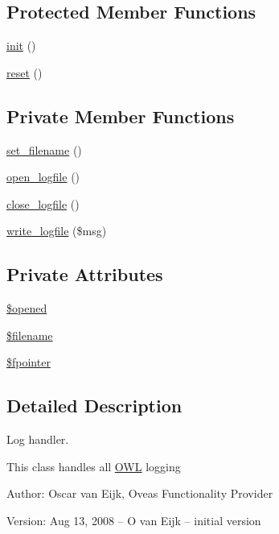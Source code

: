 \subsection*{Protected Member Functions}
\begin{CompactItemize}
\item 
\hyperlink{class__OWL_e0ef3ded56e8a6b34b6461e5a721cd3e}{init} ()
\item 
\hyperlink{class__OWL_2f2a042bcf31965194c03033df0edc9b}{reset} ()
\end{CompactItemize}
\subsection*{Private Member Functions}
\begin{CompactItemize}
\item 
\hyperlink{classLogHandler_65ef4f1c6ab4cff4057f5f5932cc690e}{set\_\-filename} ()
\item 
\hyperlink{classLogHandler_af324e5156bf8ea83e5b4e990ea99e2d}{open\_\-logfile} ()
\item 
\hyperlink{classLogHandler_1a3b03d9bb97404a4f746bd2aacc5a8c}{close\_\-logfile} ()
\item 
\hyperlink{classLogHandler_e0cd68fb6f068e47f899a1e4c7f29ba9}{write\_\-logfile} (\$msg)
\end{CompactItemize}
\subsection*{Private Attributes}
\begin{CompactItemize}
\item 
\hyperlink{classLogHandler_956e7e71a9ff96c6301d1f41a5bf207e}{\$opened}
\item 
\hyperlink{classLogHandler_b51c12bcd654093b9d0153ab38ebad8c}{\$filename}
\item 
\hyperlink{classLogHandler_d65c8954bda40d8a33828f0a0a2cbf5b}{\$fpointer}
\end{CompactItemize}


\subsection{Detailed Description}
Log handler. 

This class handles all \hyperlink{classOWL}{OWL} logging \begin{Desc}
\item[Author:]Oscar van Eijk, Oveas Functionality Provider \end{Desc}
\begin{Desc}
\item[Version:]Aug 13, 2008 -- O van Eijk -- initial version \end{Desc}


